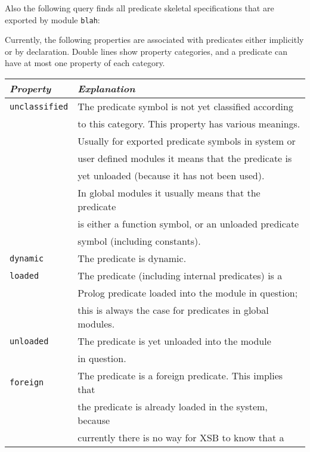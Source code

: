 \begin{description}

    Also the following query finds all predicate skeletal specifications that 
    are exported by module {\tt blah}:


    Currently, the following properties are associated with predicates 
    either implicitly or by declaration.  Double lines show property
    categories, and a predicate can have at most one property of each
    category.

    \begin{center}
    \begin{tabular}{||l|l||}               \hline 
	{\em Property}		& {\em Explanation} \\ \hline \hline
	{\tt unclassified}	& 
		The predicate symbol is not yet classified according  \\
	&	to this category. This property has various meanings. \\ 
	&	Usually for exported predicate symbols in system or   \\
	&	user defined modules it means that the predicate is   \\
	&	yet unloaded (because it has not been used).	      \\
	&	In global modules it usually means that the predicate \\
	&	is either a function symbol, or an unloaded predicate \\
	&	symbol (including constants). \\ \hline
	{\tt dynamic}	& 
		The predicate is dynamic. \\ \hline
	{\tt loaded}		& 
		The predicate (including internal predicates) is a \\ 
	&	Prolog predicate loaded into the module in question; \\
	&	this is always the case for predicates in global modules.\\ 
		\hline
	{\tt unloaded}		& 
		The predicate is yet unloaded into the module \\
	&	in question.\\ \hline
	{\tt foreign}	& 
		The predicate is a foreign predicate. This implies that  \\ 
	&	the predicate is already loaded in the system, because	 \\
	&	currently there is no way for XSB  to know that a \\

\end{tabular}
\end{center}
\end{description}
